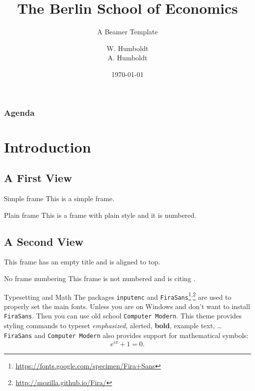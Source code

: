 \documentclass{beamer}
\title[Short Title]{The Berlin School of Economics}
\subtitle{A Beamer Template}
\author[Humboldt \& Humboldt]{W. Humboldt\texorpdfstring{\\}{,} A. Humboldt}
\institute{Berlin School of Economics}
\date{\today}
\begin{document}
    \begin{frame}
        \maketitle
    \end{frame}
    
    \begin{frame}[t]\frametitle{Agenda}
        \tableofcontents
    \end{frame}

    \section{Introduction}
    \subsection{A First View}
    \begin{frame}{Simple frame}
        This is a simple frame.
    \end{frame}

    \begin{frame}[plain]{Plain frame}
        This is a frame with plain style and it is numbered.
    \end{frame}
    
    \subsection{A Second View}
    \begin{frame}[t]
        This frame has an empty title and is aligned to top.
    \end{frame}
    
    \begin{frame}[noframenumbering]{No frame numbering}
        This frame is not numbered and is citing \cite{knuth74}.
    \end{frame}
    
    \begin{frame}{Typesetting and Math}
        The packages \texttt{inputenc} and \texttt{FiraSans}\footnote{\url{https://fonts.google.com/specimen/Fira+Sans}}\textsuperscript{,}\footnote{\url{http://mozilla.github.io/Fira/}} are used to properly set the main fonts. Unless you are on Windows and don't want to install \texttt{FiraSans}. Then you can use old school \texttt{Computer Modern}.
        \vfill
        This theme provides styling commands to typeset \emph{emphasized}, \alert{alerted}, \textbf{bold}, \textcolor{example}{example text}, \dots
        \vfill
        \texttt{FiraSans} and \texttt{Computer Modern} also provides support for mathematical symbols:
        \begin{equation*}
            e^{i\pi} + 1 = 0.
        \end{equation*}
    \end{frame}
\end{document}
